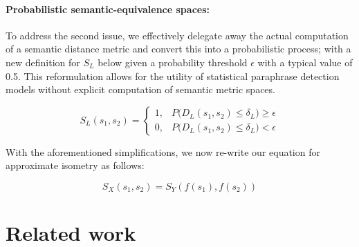 \documentclass[11pt,a4paper]{article}
\begin{document}
\paragraph{Probabilistic semantic-equivalence spaces:} To address the second issue, we effectively delegate away the actual computation of a semantic distance metric and convert this into a probabilistic process; with a new definition for $S_L$ below given a probability threshold $\epsilon$ with a typical value of 0.5. This reformulation allows for the utility of statistical paraphrase detection models without explicit computation of semantic metric spaces. 

\begin{equation}
  \label{bounded_isometry_probability_eqn}
  S_L(s_1,s_2) =
  \begin{cases}
    1, &P\big(D_L(s_1,s_2) \leq \delta_L\big) \geq \epsilon \\
    0, &P\big(D_L(s_1,s_2) \leq \delta_L\big) < \epsilon
  \end{cases}
\end{equation}

With the aforementioned simplifications, we now re-write our equation for approximate isometry as follows:

\begin{equation}  
  \label{exact_approx_isometry_eqn}
  S_X(s_1,s_2) = S_Y(f(s_1),f(s_2))
\end{equation}


\section{Related work}
\end{document}
